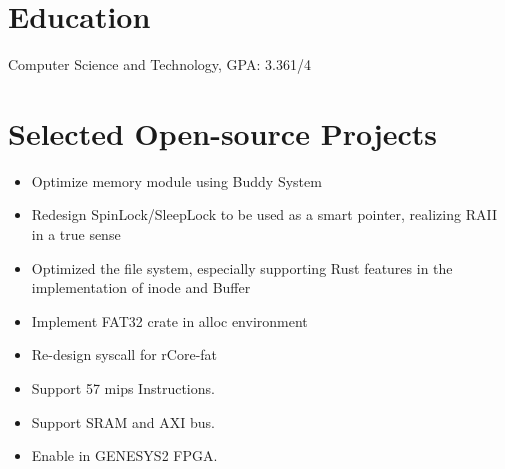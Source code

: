 \documentclass{resume}
\begin{document}



\section{Education}
Computer Science and Technology, GPA: 3.361/4

\section{Selected Open-source Projects}
\begin{itemize}
  \item Optimize memory module using Buddy System 
  \item Redesign SpinLock/SleepLock to be used as a smart pointer, realizing RAII in a true sense
  \item Optimized the file system, especially supporting Rust features in the implementation of inode and Buffer
\end{itemize}

\begin{itemize}
  \item Implement FAT32 crate in alloc environment
  \item Re-design syscall for rCore-fat
\end{itemize}

\begin{itemize}
  \item Support 57 mips Instructions.
  \item Support SRAM and AXI bus.
  \item Enable in GENESYS2 FPGA.
\end{itemize}
\end{document}

